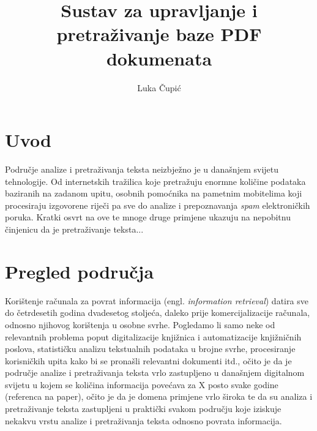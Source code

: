 \documentclass[times, utf8, zavrsni]{fer}
\begin{document}

\title{Sustav za upravljanje i pretraživanje baze PDF dokumenata}

\author{Luka Čupić}

\maketitle

\izvornik

\zahvala{}

\tableofcontents

\chapter{Uvod}
Područje analize i pretraživanja teksta neizbježno je u današnjem svijetu tehnologije. Od internetskih tražilica koje pretražuju enormne količine podataka baziranih na zadanom upitu, osobnih pomoćnika na pametnim mobitelima koji procesiraju izgovorene riječi pa sve do analize i prepoznavanja \textit{spam} elektroničkih poruka.
Kratki osvrt na ove te mnoge druge primjene ukazuju na nepobitnu činjenicu da je pretraživanje teksta...

\chapter{Pregled područja}
Korištenje računala za povrat informacija (engl. \textit{information retrieval}) datira sve do četrdesetih godina dvadesetog stoljeća, daleko prije komercijalizacije računala, odnosno njihovog korištenja u osobne svrhe. Pogledamo li samo neke od relevantnih problema poput digitalizacije knjižnica i automatizacije knjižničnih poslova, statističku analizu tekstualnih podataka u brojne svrhe, procesiranje korisničkih upita kako bi se pronašli relevantni dokumenti itd., očito je da je područje analize i pretraživanja teksta vrlo zastupljeno u današnjem digitalnom svijetu u kojem se količina informacija povećava za X posto svake godine (referenca na paper), očito je da je domena primjene vrlo široka te da su analiza i pretraživanje teksta zastupljeni u praktički svakom području koje iziskuje nekakvu vrstu analize i pretraživanja teksta odnosno povrata informacija.
\end{document}
